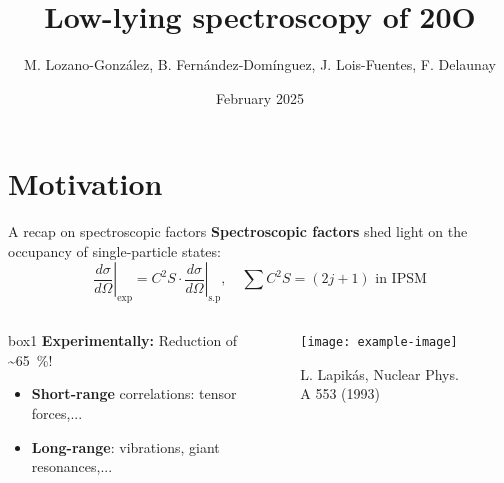 \documentclass[aspectratio=43, dvipsnames]{beamer}
\title[Oxygen spectroscopy]{Low-lying spectroscopy of 20O}
\date[Feb 2025]{February 2025}
\author[M. Lozano et al.]{M. Lozano-González, B. Fernández-Domínguez, \texorpdfstring{\newline}{} J. Lois-Fuentes, F. Delaunay}
\institute{USC-IGFAE and LPC-Caen}
\begin{document}
\maketitle

\section{Motivation}
\begin{frame}{A recap on spectroscopic factors}
	\textbf{Spectroscopic factors} shed light on the occupancy of single-particle states:
	\begin{equation*}
		\left.\frac{d\sigma}{d\Omega}\right\vert_{\text{exp}} = C^{2}S \cdot \left.\frac{d\sigma}{d\Omega}\right\vert_{\text{s.p}}, \quad \sum C^{2}S = (2j + 1) \text{ in IPSM}
	\end{equation*}
	\begin{columns}[T]
		\begin{column}{0.48\linewidth}
			\hfill{}
			\begin{beamercolorbox}[sep=0.75em, center, wd=0.85\linewidth,rounded=true]{box1}
				\textbf{Experimentally:} Reduction of \sim\qty{65}{\percent}!
			\end{beamercolorbox}%
			\hfill{}
			\begin{itemize}
				\item \textbf{Short-range} correlations: tensor forces,...
				\item \textbf{Long-range}: vibrations, giant resonances,...
			\end{itemize}
		\end{column}
		\begin{column}{0.48\linewidth}
			\vspace{-1em}
			\begin{figure}
				\texttt{[image: example-image]}
				\caption{L. Lapikás, Nuclear Phys. A 553 (1993)}
			\end{figure}
		\end{column}
	\end{columns}
\end{frame}
\end{document}
